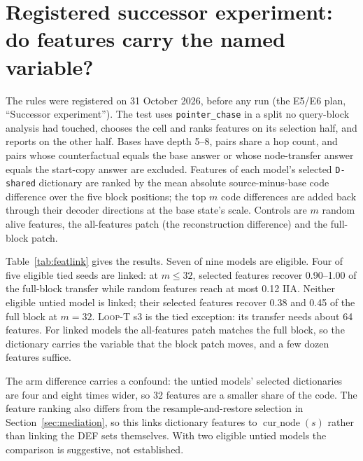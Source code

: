 \documentclass[10pt,letterpaper]{article}
\newcommand{\LoopT}{\textsc{Loop-T}}
\newcommand{\cur}{\operatorname{cur\_node}}
\begin{document}
\section{Registered successor experiment: do features carry the named variable?}\label{sec:next}
The rules were registered on 31 October 2026, before any run (the E5/E6 plan, ``Successor experiment''). The test uses \texttt{pointer\_chase} in a split no query-block analysis had touched, chooses the cell and ranks features on its selection half, and reports on the other half. Bases have depth 5--8, pairs share a hop count, and pairs whose counterfactual equals the base answer or whose node-transfer answer equals the start-copy answer are excluded. Features of each model's selected \texttt{D-shared} dictionary are ranked by the mean absolute source-minus-base code difference over the five block positions; the top $m$ code differences are added back through their decoder directions at the base state's scale. Controls are $m$ random alive features, the all-features patch (the reconstruction difference) and the full-block patch.

Table~\ref{tab:featlink} gives the results. Seven of nine models are eligible. Four of five eligible tied seeds are linked: at $m\le 32$, selected features recover 0.90--1.00 of the full-block transfer while random features reach at most 0.12 IIA. Neither eligible untied model is linked; their selected features recover 0.38 and 0.45 of the full block at $m=32$. \LoopT{} s3 is the tied exception: its transfer needs about 64 features. For linked models the all-features patch matches the full block, so the dictionary carries the variable that the block patch moves, and a few dozen features suffice.

The arm difference carries a confound: the untied models' selected dictionaries are four and eight times wider, so 32 features are a smaller share of the code. The feature ranking also differs from the resample-and-restore selection in Section~\ref{sec:mediation}, so this links dictionary features to $\cur(s)$ rather than linking the DEF sets themselves. With two eligible untied models the comparison is suggestive, not established.
\end{document}
